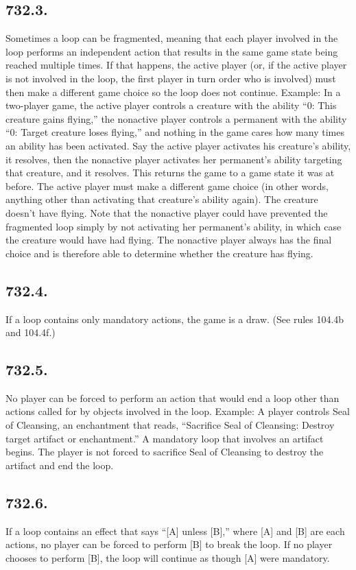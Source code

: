 \subsection*{732.3.}
Sometimes a loop can be fragmented, meaning that each player involved in the loop performs an independent action that results in the same game state being reached multiple times. If that happens, the active player (or, if the active player is not involved in the loop, the first player in turn order who is involved) must then make a different game choice so the loop does not continue.
Example: In a two-player game, the active player controls a creature with the ability “{0}: This creature gains flying,” the nonactive player controls a permanent with the ability “{0}: Target creature loses flying,” and nothing in the game cares how many times an ability has been activated. Say the active player activates his creature’s ability, it resolves, then the nonactive player activates her permanent’s ability targeting that creature, and it resolves. This returns the game to a game state it was at before. The active player must make a different game choice (in other words, anything other than activating that creature’s ability again). The creature doesn’t have flying. Note that the nonactive player could have prevented the fragmented loop simply by not activating her permanent’s ability, in which case the creature would have had flying. The nonactive player always has the final choice and is therefore able to determine whether the creature has flying.

\subsection*{732.4.}
If a loop contains only mandatory actions, the game is a draw. (See rules 104.4b and 104.4f.)

\subsection*{732.5.}
No player can be forced to perform an action that would end a loop other than actions called for by objects involved in the loop.
Example: A player controls Seal of Cleansing, an enchantment that reads, “Sacrifice Seal of Cleansing: Destroy target artifact or enchantment.” A mandatory loop that involves an artifact begins. The player is not forced to sacrifice Seal of Cleansing to destroy the artifact and end the loop.

\subsection*{732.6.}
If a loop contains an effect that says “[A] unless [B],” where [A] and [B] are each actions, no player can be forced to perform [B] to break the loop. If no player chooses to perform [B], the loop will continue as though [A] were mandatory.

